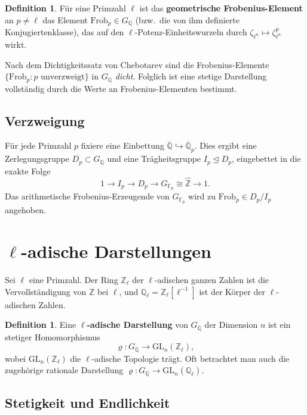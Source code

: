 \documentclass[a4paper,12pt]{amsart}
\theoremstyle{definition}
\newtheorem{definition}[theorem]{Definition}
\theoremstyle{remark}
\newcommand{\Q}{\mathbb{Q}}
\newcommand{\Z}{\mathbb{Z}}
\newcommand{\Zl}{\mathbb{Z}_\ell}
\newcommand{\Ql}{\mathbb{Q}_\ell}
\newcommand{\Fp}{\mathbb{F}_p}
\newcommand{\Qbar}{\overline{\mathbb{Q}}}
\newcommand{\GL}{\mathrm{GL}}
\newcommand{\Frob}{\mathrm{Frob}}
\begin{document}
\begin{definition}
Für eine Primzahl $\ell$ ist das \textbf{geometrische Frobenius-Element} an $p \neq \ell$
das Element $\Frob_p \in G_\Q$ (bzw.\ die von ihm definierte Konjugiertenklasse),
das auf den $\ell$-Potenz-Einheitswurzeln durch $\zeta_{\ell^n} \mapsto \zeta_{\ell^n}^p$
wirkt.
\end{definition}

Nach dem Dichtigkeitssatz von Chebotarev sind die Frobenius-Elemente
$\{\Frob_p : p \text{ unverzweigt}\}$ in $G_\Q$ \emph{dicht}. Folglich ist eine
stetige Darstellung vollständig durch die Werte an Frobenius-Elementen bestimmt.

\subsection{Verzweigung}

Für jede Primzahl $p$ fixiere eine Einbettung $\Qbar \hookrightarrow \overline{\Q}_p$.
Dies ergibt eine Zerlegungsgruppe $D_p \subset G_\Q$ und eine Trägheitsgruppe
$I_p \trianglelefteq D_p$, eingebettet in die exakte Folge
\[
  1 \to I_p \to D_p \to G_{\Fp} \cong \hat{\Z} \to 1.
\]
Das arithmetische Frobenius-Erzeugende von $G_{\Fp}$ wird zu $\Frob_p \in D_p/I_p$ angehoben.

\section{\texorpdfstring{$\ell$}{l}-adische Darstellungen}
\label{sec:ell-adisch}

Sei $\ell$ eine Primzahl. Der Ring $\Zl$ der $\ell$-adischen ganzen Zahlen ist die
Vervollständigung von $\Z$ bei $\ell$, und $\Ql = \Zl[\ell^{-1}]$ ist der Körper der
$\ell$-adischen Zahlen.

\begin{definition}
Eine \textbf{$\ell$-adische Darstellung} von $G_\Q$ der Dimension $n$ ist ein stetiger
Homomorphismus
\[
  \varrho\colon G_\Q \to \GL_n(\Zl),
\]
wobei $\GL_n(\Zl)$ die $\ell$-adische Topologie trägt. Oft betrachtet man auch die
zugehörige rationale Darstellung $\varrho\colon G_\Q \to \GL_n(\Ql)$.
\end{definition}

\subsection{Stetigkeit und Endlichkeit}
\end{document}

